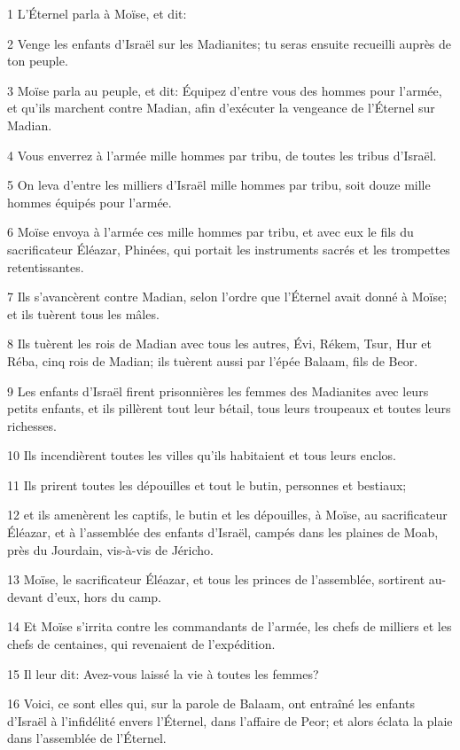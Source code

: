 \par 1 L'Éternel parla à Moïse, et dit:
\par 2 Venge les enfants d'Israël sur les Madianites; tu seras ensuite recueilli auprès de ton peuple.
\par 3 Moïse parla au peuple, et dit: Équipez d'entre vous des hommes pour l'armée, et qu'ils marchent contre Madian, afin d'exécuter la vengeance de l'Éternel sur Madian.
\par 4 Vous enverrez à l'armée mille hommes par tribu, de toutes les tribus d'Israël.
\par 5 On leva d'entre les milliers d'Israël mille hommes par tribu, soit douze mille hommes équipés pour l'armée.
\par 6 Moïse envoya à l'armée ces mille hommes par tribu, et avec eux le fils du sacrificateur Éléazar, Phinées, qui portait les instruments sacrés et les trompettes retentissantes.
\par 7 Ils s'avancèrent contre Madian, selon l'ordre que l'Éternel avait donné à Moïse; et ils tuèrent tous les mâles.
\par 8 Ils tuèrent les rois de Madian avec tous les autres, Évi, Rékem, Tsur, Hur et Réba, cinq rois de Madian; ils tuèrent aussi par l'épée Balaam, fils de Beor.
\par 9 Les enfants d'Israël firent prisonnières les femmes des Madianites avec leurs petits enfants, et ils pillèrent tout leur bétail, tous leurs troupeaux et toutes leurs richesses.
\par 10 Ils incendièrent toutes les villes qu'ils habitaient et tous leurs enclos.
\par 11 Ils prirent toutes les dépouilles et tout le butin, personnes et bestiaux;
\par 12 et ils amenèrent les captifs, le butin et les dépouilles, à Moïse, au sacrificateur Éléazar, et à l'assemblée des enfants d'Israël, campés dans les plaines de Moab, près du Jourdain, vis-à-vis de Jéricho.
\par 13 Moïse, le sacrificateur Éléazar, et tous les princes de l'assemblée, sortirent au-devant d'eux, hors du camp.
\par 14 Et Moïse s'irrita contre les commandants de l'armée, les chefs de milliers et les chefs de centaines, qui revenaient de l'expédition.
\par 15 Il leur dit: Avez-vous laissé la vie à toutes les femmes?
\par 16 Voici, ce sont elles qui, sur la parole de Balaam, ont entraîné les enfants d'Israël à l'infidélité envers l'Éternel, dans l'affaire de Peor; et alors éclata la plaie dans l'assemblée de l'Éternel.
